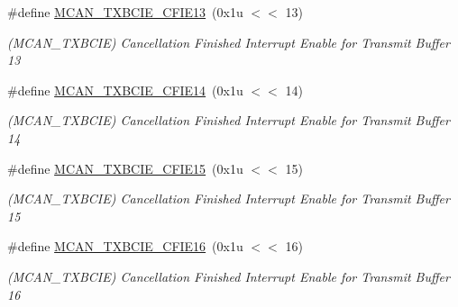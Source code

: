 \begin{DoxyCompactItemize}
\mbox{\label{group__SAME70__MCAN_ga58073a658c0192b15d9106cf01248432}} 
\#define \mbox{\hyperlink{group__SAME70__MCAN_ga58073a658c0192b15d9106cf01248432}{M\+C\+A\+N\+\_\+\+T\+X\+B\+C\+I\+E\+\_\+\+C\+F\+I\+E13}}~(0x1u $<$$<$ 13)
\begin{DoxyCompactList}\small\item\em (M\+C\+A\+N\+\_\+\+T\+X\+B\+C\+IE) Cancellation Finished Interrupt Enable for Transmit Buffer 13 \end{DoxyCompactList}\item 
\mbox{\label{group__SAME70__MCAN_gadbf481736621f861e46febec15612697}} 
\#define \mbox{\hyperlink{group__SAME70__MCAN_gadbf481736621f861e46febec15612697}{M\+C\+A\+N\+\_\+\+T\+X\+B\+C\+I\+E\+\_\+\+C\+F\+I\+E14}}~(0x1u $<$$<$ 14)
\begin{DoxyCompactList}\small\item\em (M\+C\+A\+N\+\_\+\+T\+X\+B\+C\+IE) Cancellation Finished Interrupt Enable for Transmit Buffer 14 \end{DoxyCompactList}\item 
\mbox{\label{group__SAME70__MCAN_ga0fa2d4b9cecc03b5a198086fff261ce1}} 
\#define \mbox{\hyperlink{group__SAME70__MCAN_ga0fa2d4b9cecc03b5a198086fff261ce1}{M\+C\+A\+N\+\_\+\+T\+X\+B\+C\+I\+E\+\_\+\+C\+F\+I\+E15}}~(0x1u $<$$<$ 15)
\begin{DoxyCompactList}\small\item\em (M\+C\+A\+N\+\_\+\+T\+X\+B\+C\+IE) Cancellation Finished Interrupt Enable for Transmit Buffer 15 \end{DoxyCompactList}\item 
\mbox{\label{group__SAME70__MCAN_gad434237074221ea8e961f5e29348be63}} 
\#define \mbox{\hyperlink{group__SAME70__MCAN_gad434237074221ea8e961f5e29348be63}{M\+C\+A\+N\+\_\+\+T\+X\+B\+C\+I\+E\+\_\+\+C\+F\+I\+E16}}~(0x1u $<$$<$ 16)
\begin{DoxyCompactList}\small\item\em (M\+C\+A\+N\+\_\+\+T\+X\+B\+C\+IE) Cancellation Finished Interrupt Enable for Transmit Buffer 16 \end{DoxyCompactList}\item 
\mbox{\label{group__SAME70__MCAN_ga1066c22367c2c2d2e4db5fdca542deed}} 

\end{DoxyCompactItemize}
